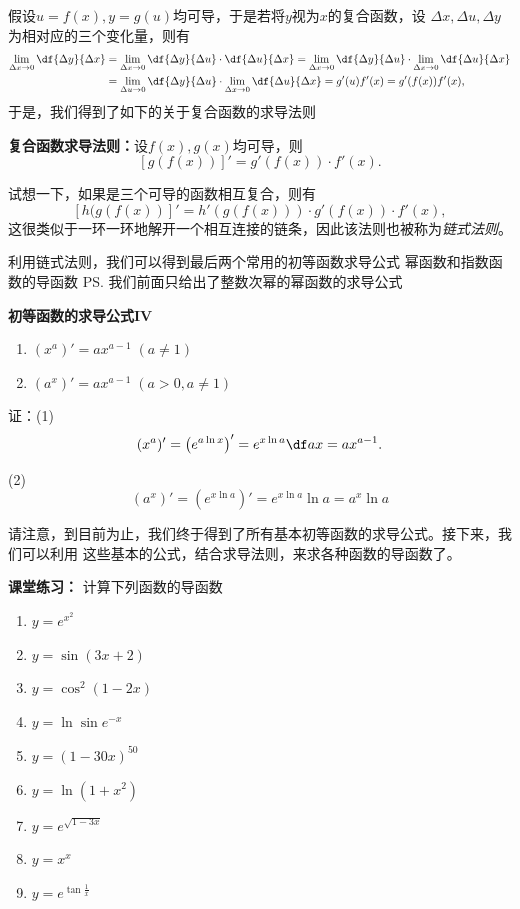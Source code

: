 假设$u=f(x),y=g(u)$均可导，于是若将$y$视为$x$的复合函数，设
$\Delta x,\Delta u,\Delta y$为相对应的三个变化量，则有
\begin{align*}
	\lim\limits_{\Delta x\to 0}\df{\Delta y}{\Delta x}
	&=\lim\limits_{\Delta x\to 0}\df{\Delta y}{\Delta u}
	\cdot\df{\Delta u}{\Delta x}
	=\lim\limits_{\Delta x\to 0}\df{\Delta y}{\Delta u}
	\cdot\lim\limits_{\Delta x\to 0}\df{\Delta u}{\Delta x}\\
	&=\lim\limits_{\Delta u\to 0}\df{\Delta y}{\Delta u}
	\cdot\lim\limits_{\Delta x\to 0}\df{\Delta u}{\Delta x}
	=g'(u)f'(x)=g'(f(x))f'(x),
\end{align*}
于是，我们得到了如下的关于复合函数的求导法则
\begin{thx}
	{\bf 复合函数求导法则：}设$f(x),g(x)$均可导，则
	$$[g(f(x))]'=g'(f(x))\cdot f'(x).$$
\end{thx}
试想一下，如果是三个可导的函数相互复合，则有
$$[h(g(f(x))]'=h'(g(f(x)))\cdot g'(f(x))\cdot f'(x),$$
这很类似于一环一环地解开一个相互连接的链条，因此该法则也被称为{\it 链式法则}。

\bs
利用链式法则，我们可以得到最后两个常用的初等函数求导公式
\egz 幂函数和指数函数的导函数
\ps{我们前面只给出了整数次幂的幂函数的求导公式}
\begin{thx}
	{\bf 初等函数的求导公式IV}
	\begin{enumerate}[(1)]
	  \item $(x^a)'=ax^{a-1}\;(a\ne 1)$
	  \item $(a^x)'=ax^{a-1}\;(a>0,a\ne 1)$
	\end{enumerate}
\end{thx}

证：(1)
$$(x^a)'=\left(e^{a\ln x}\right)'=e^{x\ln a}\df ax=ax^{a-1}.$$

(2)
$$(a^x)'=\left(e^{x\ln a}\right)'
=e^{x\ln a}\ln a=a^x\ln a$$
\fin

请注意，到目前为止，我们终于得到了所有基本初等函数的求导公式。接下来，我们可以利用
这些基本的公式，结合求导法则，来求各种函数的导函数了。

\bs
{\bf 课堂练习：} 计算下列函数的导函数
\begin{enumerate}[(1)]
  \setlength{\itemindent}{1cm}
  \item $y=e^{x^2}$ 
  \item $y=\sin (3x+2)$ 
  \item $y=\cos^2(1-2x)$ 
  \item $y=\ln\sin e^{-x}$ 
  \item $y=(1-30x)^{50}$ 
  \item $y=\ln(1+x^2)$ 
  \item $y=e^{\sqrt{1-3x}}$ 
  \item $y=x^x$ 
  \item $y=e^{\tan\frac 1x}$
\end{enumerate}

